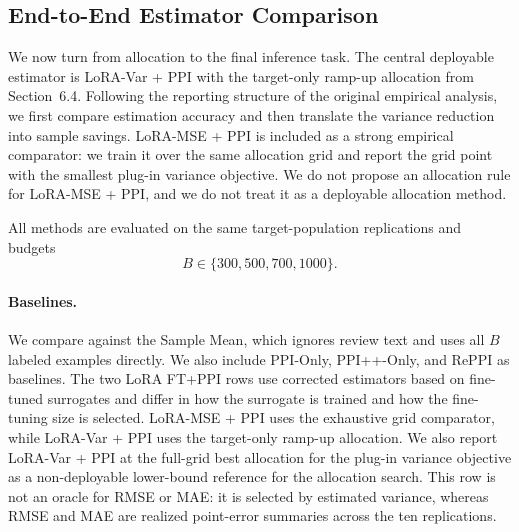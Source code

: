 \documentclass[11pt]{article}
\begin{document}
\subsection{End-to-End Estimator Comparison}
\label{subsec:end_to_end}

We now turn from allocation to the final inference task. The central deployable estimator is
LoRA-Var + PPI with the target-only ramp-up allocation from Section~6.4. Following the reporting
structure of the original empirical analysis, we first compare estimation accuracy and then
translate the variance reduction into sample savings. LoRA-MSE + PPI is included as a strong
empirical comparator: we train it over the same allocation grid and report the grid point with
the smallest plug-in variance objective. We do not propose an allocation rule for LoRA-MSE + PPI,
and we do not treat it as a deployable allocation method.

All methods are evaluated on the same target-population replications and budgets
\[
    B\in\{300,500,700,1000\}.
\]

\paragraph{Baselines.}
We compare against the Sample Mean, which ignores review text and uses all $B$ labeled examples
directly. We also include PPI-Only, PPI++-Only, and RePPI as baselines. The two LoRA FT+PPI rows use
corrected estimators based on fine-tuned surrogates and differ in how the surrogate is trained and
how the fine-tuning size is selected. LoRA-MSE + PPI uses the exhaustive grid comparator, while
LoRA-Var + PPI uses the target-only ramp-up allocation. We also report
LoRA-Var + PPI at the full-grid best allocation for the plug-in variance objective as a
non-deployable lower-bound reference for the allocation search. This row is not an oracle for
RMSE or MAE: it is selected by estimated variance, whereas RMSE and MAE are realized point-error
summaries across the ten replications.
\end{document}
